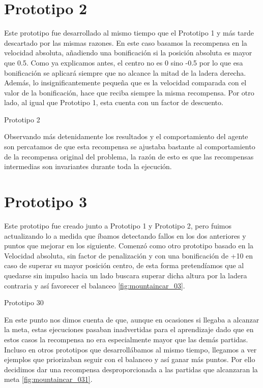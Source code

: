 \section{Prototipo 2}
Este prototipo fue desarrollado al mismo tiempo que el Prototipo 1 y más tarde descartado por las mismas razones.
En este caso basamos la recompensa en la velocidad absoluta, añadiendo una bonificación si la posición absoluta es mayor que 0.5. Como ya explicamos antes, el centro no es 0 sino -0.5 por lo que esa bonificación se aplicará siempre que no alcance la mitad de la ladera derecha. Además, lo insignificantemente pequeña que es la velocidad comparada con el valor de la bonificación, hace que reciba siempre la misma recompensa. Por otro lado, al igual que Prototipo 1, esta cuenta con un factor de descuento.

%
{Prototipo 2}

Observando más detenidamente los resultados y el comportamiento del agente son percatamos de que esta recompensa se ajustaba bastante al comportamiento de la recompensa original del problema, la razón de esto es que las recompensas intermedias son invariantes durante toda la ejecución.

\section{Prototipo 3}
Este prototipo fue creado junto a Prototipo 1 y Prototipo 2, pero fuimos actualizando lo a medida que íbamos detectando fallos en los dos anteriores y puntos que mejorar en los siguiente.
Comenzó como otro prototipo basado en la Velocidad absoluta, sin factor de penalización y con una bonificación de +10 en caso de superar su mayor posición centro, de esta forma pretendíamos que al quedarse sin impulso hacia un lado buscara superar dicha altura por la ladera contraria y así favorecer el balanceo \ref{fig:mountaincar_03}.

%
{Prototipo 30}

En este punto nos dimos cuenta de que, aunque en ocasiones si llegaba a alcanzar la meta, estas ejecuciones pasaban inadvertidas para el aprendizaje dado que en estos casos la recompensa no era especialmente mayor que las demás partidas. Incluso en otros prototipos que desarrollábamos al mismo tiempo, llegamos a ver ejemplos que priorizaban seguir con el balanceo y así ganar más puntos.
Por ello decidimos dar una recompensa desproporcionada a las partidas que alcanzaran la meta \ref{fig:mountaincar_031}.

